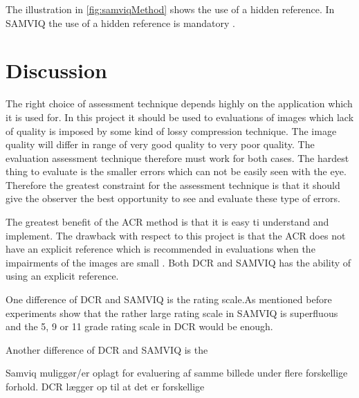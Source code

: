 The illustration in \autoref{fig:samviqMethod} shows the use of a hidden reference. In SAMVIQ the use of a hidden reference is mandatory \cite{Kozamernik2005}.


\section{Discussion} %
\label{sec:discussion}

The right choice of assessment technique depends highly on the application which it is used for. In this project it should be used to evaluations of images which lack of quality is imposed by some kind of lossy compression technique. The image quality will differ in range of very good quality to very poor quality. The evaluation assessment technique therefore must work for both cases. The hardest thing to evaluate is the smaller errors which can not be easily seen with the eye. Therefore the greatest constraint for the assessment technique is that it should give the observer the best opportunity to see and evaluate these type of errors.

The greatest benefit of the ACR method is that it is easy ti understand and implement. The drawback with respect to this project is that the ACR does not have an explicit reference which is recommended in evaluations when the impairments of the images are small \cite{ITU-TRecommendationP.9102008}. Both DCR and SAMVIQ has the ability of using an explicit reference.

One difference of DCR and SAMVIQ is the rating scale.As mentioned before experiments show that the rather large rating scale in SAMVIQ is superfluous \cite{Rouse2010} and the 5, 9 or 11 grade rating scale in DCR would be enough. 

Another difference of DCR and SAMVIQ is the 

Samviq muliggør/er oplagt for evaluering af samme billede under flere forskellige forhold. DCR lægger op til at det er forskellige 

